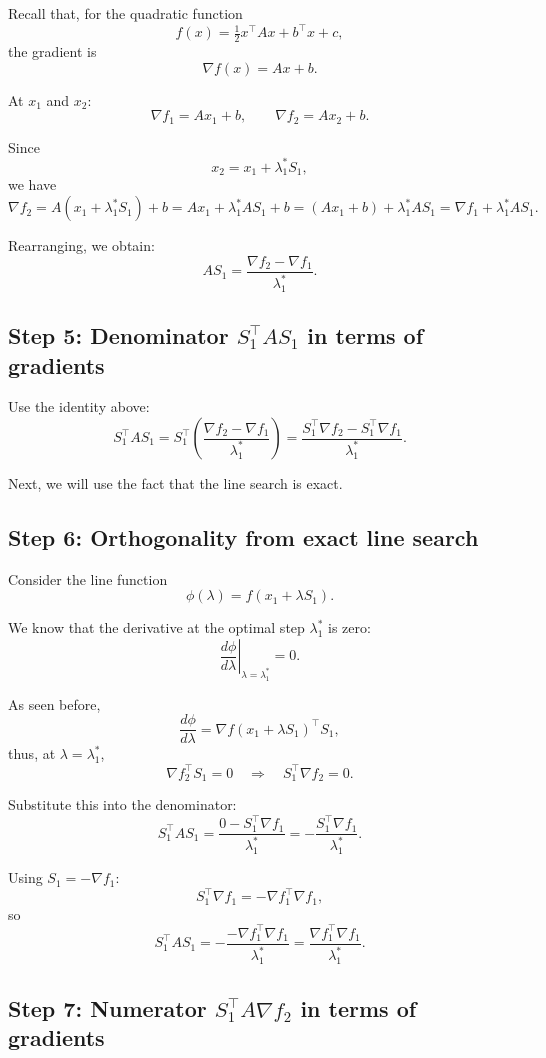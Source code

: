 \documentclass[9pt,a4paper]{extarticle}
\begin{document}
Recall that, for the quadratic function
\[
f(x) = \tfrac{1}{2} x^\top A x + b^\top x + c,
\]
the gradient is
\[
\nabla f(x) = A x + b.
\]

At $x_1$ and $x_2$:
\[
\nabla f_1 = A x_1 + b, 
\qquad
\nabla f_2 = A x_2 + b.
\]

Since
\[
x_2 = x_1 + \lambda_1^* S_1,
\]
we have
\[
\nabla f_2
= A(x_1 + \lambda_1^* S_1) + b
= A x_1 + \lambda_1^* A S_1 + b
= (A x_1 + b) + \lambda_1^* A S_1
= \nabla f_1 + \lambda_1^* A S_1.
\]

Rearranging, we obtain:
\[
A S_1 = \frac{\nabla f_2 - \nabla f_1}{\lambda_1^*}.
\]

\subsection*{Step 5: Denominator $S_1^\top A S_1$ in terms of gradients}

Use the identity above:
\[
S_1^\top A S_1
= S_1^\top \left( \frac{\nabla f_2 - \nabla f_1}{\lambda_1^*} \right)
= \frac{S_1^\top \nabla f_2 - S_1^\top \nabla f_1}{\lambda_1^*}.
\]

Next, we will use the fact that the line search is exact.

\subsection*{Step 6: Orthogonality from exact line search}

Consider the line function
\[
\phi(\lambda) = f(x_1 + \lambda S_1).
\]

We know that the derivative at the optimal step $\lambda_1^*$ is zero:
\[
\left. \frac{d\phi}{d\lambda} \right|_{\lambda = \lambda_1^*}
= 0.
\]

As seen before,
\[
\frac{d\phi}{d\lambda}
= \nabla f(x_1 + \lambda S_1)^\top S_1,
\]
thus, at $\lambda = \lambda_1^*$,
\[
\nabla f_2^\top S_1 = 0
\quad\Longrightarrow\quad
S_1^\top \nabla f_2 = 0.
\]

Substitute this into the denominator:
\[
S_1^\top A S_1
= \frac{0 - S_1^\top \nabla f_1}{\lambda_1^*}
= - \frac{S_1^\top \nabla f_1}{\lambda_1^*}.
\]

Using $S_1 = -\nabla f_1$:
\[
S_1^\top \nabla f_1 = - \nabla f_1^\top \nabla f_1,
\]
so
\[
S_1^\top A S_1
= - \frac{- \nabla f_1^\top \nabla f_1}{\lambda_1^*}
= \frac{\nabla f_1^\top \nabla f_1}{\lambda_1^*}.
\]

\subsection*{Step 7: Numerator $S_1^\top A \nabla f_2$ in terms of gradients}
\end{document}

